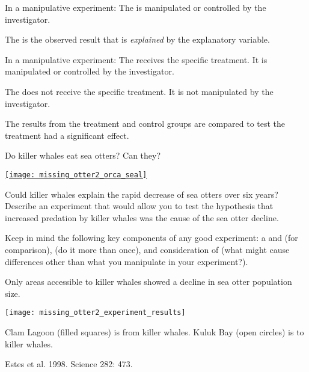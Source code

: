 \documentclass[t]{beamer}
\begin{document}
%
\begin{frame}[t]{In a manipulative experiment:}
	\hangpara The  is manipulated or controlled by the investigator.
	
	\hangpara The  is the observed result that is \emph{explained} by the explanatory variable.
\end{frame}
%
\begin{frame}[t]{In a manipulative experiment:}
	\hangpara The  receives the specific treatment. It is manipulated or controlled by the investigator.
	
	\hangpara The  does not receive the specific treatment. It is not manipulated by the investigator.
	
	\hangpara The results from the treatment and control groups are compared to test the treatment had a significant effect.

\end{frame}
%
\begin{frame}[t]{Do killer whales eat sea otters? Can they?}


	\href{https://www.youtube.com/watch?v=E1dg9pVQp3M}{\texttt{[image: missing\_otter2\_orca\_seal]}}

\end{frame}
%
\begin{frame}[t]{Could killer whales explain the rapid decrease of sea otters over six years?}
	\hangpara Describe an experiment that would allow you to test the hypothesis that increased predation by killer whales was the cause of the sea otter decline. 
	
	\hangpara Keep in mind the following key components of any good experiment: a  and  (for comparison),  (do it more than once), and consideration of  (what might cause differences other than what you manipulate in your experiment?).

\end{frame}
%
\begin{frame}[t]{Only areas accessible to killer whales showed a decline in sea otter population size.}

\texttt{[image: missing\_otter2\_experiment\_results]}

Clam Lagoon (filled squares) is  from killer whales.\newline
Kuluk Bay (open circles) is  to killer whales.

\vfilll

\hfill \tiny Estes et al. 1998. Science 282: 473.
\end{frame}
\end{document}

